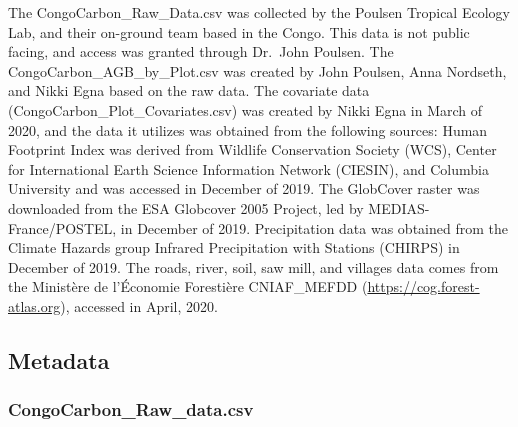 \documentclass[12pt,]{article}
\begin{document}
The CongoCarbon\_Raw\_Data.csv was collected by the Poulsen Tropical
Ecology Lab, and their on-ground team based in the Congo. This data is
not public facing, and access was granted through Dr.~John Poulsen. The
CongoCarbon\_AGB\_by\_Plot.csv was created by John Poulsen, Anna
Nordseth, and Nikki Egna based on the raw data. The covariate data
(CongoCarbon\_Plot\_Covariates.csv) was created by Nikki Egna in March
of 2020, and the data it utilizes was obtained from the following
sources: Human Footprint Index was derived from Wildlife Conservation
Society (WCS), Center for International Earth Science Information
Network (CIESIN), and Columbia University and was accessed in December
of 2019. The GlobCover raster was downloaded from the ESA Globcover 2005
Project, led by MEDIAS-France/POSTEL, in December of 2019. Precipitation
data was obtained from the Climate Hazards group Infrared Precipitation
with Stations (CHIRPS) in December of 2019. The roads, river, soil, saw
mill, and villages data comes from the Ministère de l'Économie
Forestière CNIAF\_MEFDD (\url{https://cog.forest-atlas.org}), accessed
in April, 2020.

\hypertarget{metadata}{%
\subsection{Metadata}\label{metadata}}

\hypertarget{congocarbon_raw_data.csv}{%
\subsubsection{CongoCarbon\_Raw\_data.csv}\label{congocarbon_raw_data.csv}}
\end{document}
